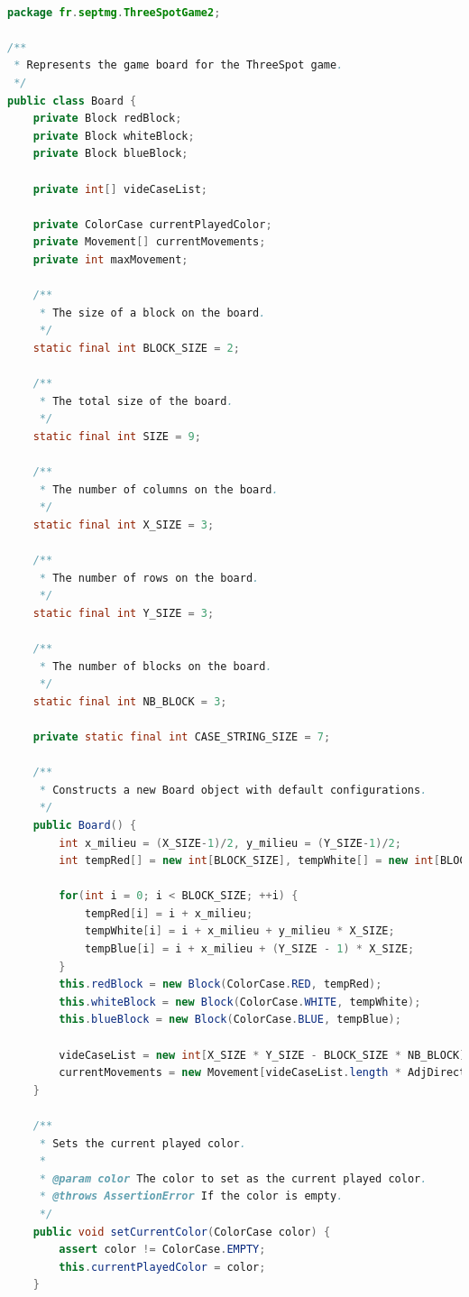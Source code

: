 \documentclass[a4paper,11pt]{article}
\begin{document}
\begin{lstlisting}[language=Java, breaklines=true]

package fr.septmg.ThreeSpotGame2;

/**
 * Represents the game board for the ThreeSpot game.
 */
public class Board {
    private Block redBlock;
    private Block whiteBlock;
    private Block blueBlock;

    private int[] videCaseList;

    private ColorCase currentPlayedColor;
    private Movement[] currentMovements;
    private int maxMovement;

    /**
     * The size of a block on the board.
     */
    static final int BLOCK_SIZE = 2;

    /**
     * The total size of the board.
     */
    static final int SIZE = 9;

    /**
     * The number of columns on the board.
     */
    static final int X_SIZE = 3;

    /**
     * The number of rows on the board.
     */
    static final int Y_SIZE = 3;

    /**
     * The number of blocks on the board.
     */
    static final int NB_BLOCK = 3;

    private static final int CASE_STRING_SIZE = 7;

    /**
     * Constructs a new Board object with default configurations.
     */
    public Board() {
        int x_milieu = (X_SIZE-1)/2, y_milieu = (Y_SIZE-1)/2;
        int tempRed[] = new int[BLOCK_SIZE], tempWhite[] = new int[BLOCK_SIZE], tempBlue[] = new int[BLOCK_SIZE];

        for(int i = 0; i < BLOCK_SIZE; ++i) {
            tempRed[i] = i + x_milieu;
            tempWhite[i] = i + x_milieu + y_milieu * X_SIZE;
            tempBlue[i] = i + x_milieu + (Y_SIZE - 1) * X_SIZE;
        }
        this.redBlock = new Block(ColorCase.RED, tempRed);
        this.whiteBlock = new Block(ColorCase.WHITE, tempWhite);
        this.blueBlock = new Block(ColorCase.BLUE, tempBlue);

        videCaseList = new int[X_SIZE * Y_SIZE - BLOCK_SIZE * NB_BLOCK];
        currentMovements = new Movement[videCaseList.length * AdjDirection.values().length];
    }

    /**
     * Sets the current played color.
     *
     * @param color The color to set as the current played color.
     * @throws AssertionError If the color is empty.
     */
    public void setCurrentColor(ColorCase color) {
        assert color != ColorCase.EMPTY;
        this.currentPlayedColor = color;
    }


\end{lstlisting}
\end{document}
